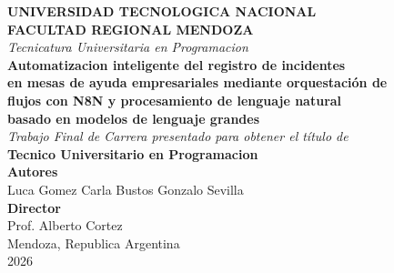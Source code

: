 \thispagestyle{empty}

\begin{center}

{\large\textbf{UNIVERSIDAD TECNOLOGICA NACIONAL}}\\[4pt]
{\large\textbf{FACULTAD REGIONAL MENDOZA}}\\[24pt]

{\itshape\large Tecnicatura Universitaria en Programacion}\\[36pt]

{\LARGE\bfseries Automatizacion inteligente del registro de incidentes}\\[6pt]
{\LARGE\bfseries en mesas de ayuda empresariales mediante orquestación de}\\[6pt]
{\LARGE\bfseries flujos con N8N y procesamiento de lenguaje natural}\\[6pt]
{\LARGE\bfseries basado en modelos de lenguaje grandes}\\[36pt]

{\normalsize\itshape Trabajo Final de Carrera presentado para obtener el título de}\\[12pt]
{\large\bfseries Tecnico Universitario en Programacion}\\[48pt]

{\normalsize\textbf{Autores}}\\[6pt]
{\large Luca Gomez \quad\textperiodcentered\quad Carla Bustos \quad\textperiodcentered\quad Gonzalo Sevilla}\\[24pt]

{\normalsize\textbf{Director}}\\[6pt]
{\large Prof. Alberto Cortez}\\[48pt]

{\normalsize Mendoza, Republica Argentina}\\[6pt]
{\normalsize 2026}

\end{center}

\newpage
